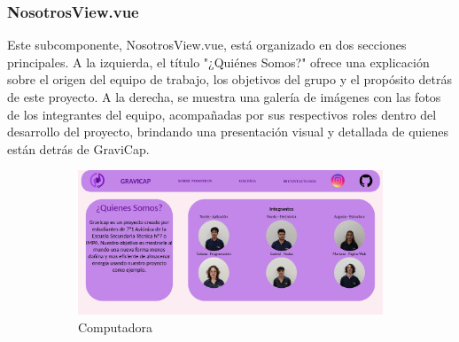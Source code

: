                 \subsubsection{NosotrosView.vue}
                    Este subcomponente, NosotrosView.vue, está organizado en dos secciones principales. A la izquierda, el título "¿Quiénes Somos?" ofrece una explicación sobre el origen del equipo de trabajo, los objetivos del grupo y el propósito detrás de este proyecto. A la derecha, se muestra una galería de imágenes con las fotos de los integrantes del equipo, acompañadas por sus respectivos roles dentro del desarrollo del proyecto, brindando una presentación visual y detallada de quienes están detrás de \textcolor{dark_violet}{GraviCap}.\par

                    \begin{figure} [H]
                    \centering
                    \begin{subfigure}{0.5\textwidth}
                        \centering
                        \includegraphics[width=\textwidth]{Página Web/Computadora/Integrantes.png}
                        \caption{Computadora}
                        \label{fig:pw3.1}
                    \end{subfigure}
                    \hfill
                    \begin{subfigure}{0.4\textwidth}
                        \centering

\end{subfigure}
\end{figure}
